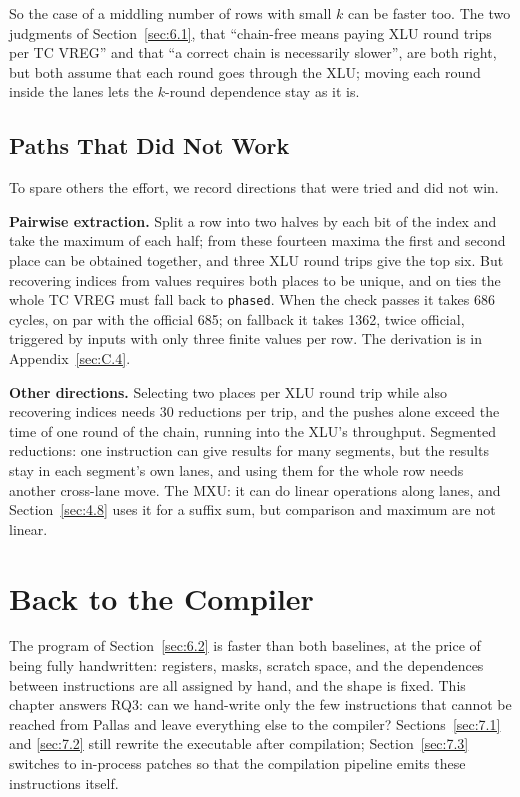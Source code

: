 \documentclass[sigconf,nonacm,balance=false]{acmart}
\newcommand{\code}[1]{\texttt{#1}}
\begin{document}
So the case of a middling number of rows with small $k$ can be faster too. The two judgments of Section~\ref{sec:6.1}, that ``chain-free means paying XLU round trips per TC VREG'' and that ``a correct chain is necessarily slower'', are both right, but both assume that each round goes through the XLU; moving each round inside the lanes lets the $k$-round dependence stay as it is.

\subsection{Paths That Did Not Work}
\label{sec:6.7}

To spare others the effort, we record directions that were tried and did not win.

\textbf{Pairwise extraction.} Split a row into two halves by each bit of the index and take the maximum of each half; from these fourteen maxima the first and second place can be obtained together, and three XLU round trips give the top six. But recovering indices from values requires both places to be unique, and on ties the whole TC VREG must fall back to \code{phased}. When the check passes it takes 686 cycles, on par with the official 685; on fallback it takes 1362, twice official, triggered by inputs with only three finite values per row. The derivation is in Appendix~\ref{sec:C.4}.

\textbf{Other directions.} Selecting two places per XLU round trip while also recovering indices needs 30 reductions per trip, and the pushes alone exceed the time of one round of the chain, running into the XLU's throughput. Segmented reductions: one instruction can give results for many segments, but the results stay in each segment's own lanes, and using them for the whole row needs another cross-lane move. The MXU: it can do linear operations along lanes, and Section~\ref{sec:4.8} uses it for a suffix sum, but comparison and maximum are not linear.

\section{Back to the Compiler}
\label{sec:7}

The program of Section~\ref{sec:6.2} is faster than both baselines, at the price of being fully handwritten: registers, masks, scratch space, and the dependences between instructions are all assigned by hand, and the shape is fixed. This chapter answers RQ3: can we hand-write only the few instructions that cannot be reached from Pallas and leave everything else to the compiler? Sections~\ref{sec:7.1} and \ref{sec:7.2} still rewrite the executable after compilation; Section~\ref{sec:7.3} switches to in-process patches so that the compilation pipeline emits these instructions itself.
\end{document}
